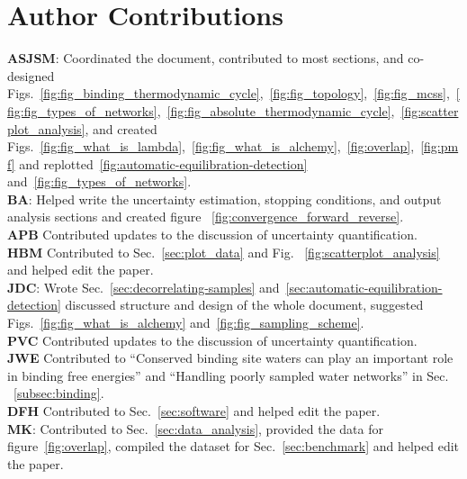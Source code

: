 \documentclass[9pt,bestpractices]{livecoms}
\begin{document}
\section*{Author Contributions}
%
\textbf{ASJSM}: Coordinated the document, contributed to most sections, and co-designed Figs.~\ref{fig:fig_binding_thermodynamic_cycle},~\ref{fig:fig_topology},~\ref{fig:fig_mcss},~\ref{fig:fig_types_of_networks},~\ref{fig:fig_absolute_thermodynamic_cycle},~\ref{fig:scatterplot_analysis}, and created Figs.~\ref{fig:fig_what_is_lambda},~\ref{fig:fig_what_is_alchemy},~\ref{fig:overlap},~\ref{fig:pmf} and replotted~\ref{fig:automatic-equilibration-detection} and~\ref{fig:fig_types_of_networks}.\\
\textbf{BA}: Helped write the uncertainty estimation, stopping conditions, and output analysis sections and created figure ~\ref{fig:convergence_forward_reverse}.\\
\textbf{APB} Contributed updates to the discussion of uncertainty quantification.\\
\textbf{HBM} Contributed to Sec.~\ref{sec:plot_data} and Fig.~ \ref{fig:scatterplot_analysis} and helped edit the paper.\\
\textbf{JDC}: Wrote Sec.~\ref{sec:decorrelating-samples} and~\ref{sec:automatic-equilibration-detection} discussed structure and design of the whole document, suggested Figs.~\ref{fig:fig_what_is_alchemy} and~\ref{fig:fig_sampling_scheme}. \\
\textbf{PVC} Contributed updates to the discussion of uncertainty quantification.\\
\textbf{JWE} Contributed to ``Conserved binding site waters can play an important role in binding free energies'' and ``Handling poorly sampled water networks'' in Sec. ~\ref{subsec:binding}.\\
\textbf{DFH} Contributed to Sec.~\ref{sec:software} and helped edit the paper. \\
\textbf{MK}: Contributed to Sec.~\ref{sec:data_analysis}, provided the data for figure~\ref{fig:overlap}, compiled the dataset for Sec.~\ref{sec:benchmark} and helped edit the paper.\\
\end{document}
